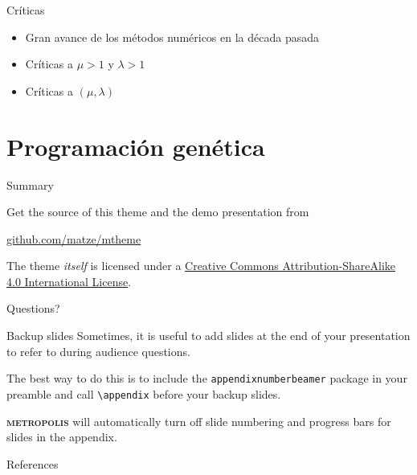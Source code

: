 \documentclass[10pt]{beamer}
\newcommand{\themename}{\textbf{\textsc{metropolis}}\xspace}
\begin{document}
\begin{frame}{Críticas}
  \begin{itemize}\itemsep2pt
  \item Gran avance de los métodos numéricos en la década pasada
  \item Críticas a $\mu > 1$ y $\lambda > 1$
  \item Críticas a $(\mu, \lambda)$
  \end{itemize}
\end{frame}

\section{Programación genética}

\begin{frame}{Summary}

  Get the source of this theme and the demo presentation from

  \begin{center}\url{github.com/matze/mtheme}\end{center}

  The theme \emph{itself} is licensed under a
  \href{http://creativecommons.org/licenses/by-sa/4.0/}{Creative Commons
  Attribution-ShareAlike 4.0 International License}.

  \begin{center}\ccbysa\end{center}

\end{frame}

\begin{frame}[standout]
  Questions?
\end{frame}

\appendix

\begin{frame}[fragile]{Backup slides}
  Sometimes, it is useful to add slides at the end of your presentation to
  refer to during audience questions.

  The best way to do this is to include the \verb|appendixnumberbeamer|
  package in your preamble and call \verb|\appendix| before your backup slides.

  \themename will automatically turn off slide numbering and progress bars for
  slides in the appendix.
\end{frame}

\begin{frame}[allowframebreaks]{References}

  
  

\end{frame}
\end{document}
